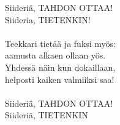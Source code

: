 
Siideriä, TAHDON OTTAA!\\
Siideria, TIETENKIN!\\
\hspace{10mm} \\
Teekkari tietää ja fuksi myös:\\
aamusta alkaen ollaan yös.\\
Yhdessä näin kun dokaillaan,\\
helposti kaiken valmiiksi saa!\\
\hspace{10mm} \\
Siideriä, TAHDON OTTAA!\\
Siideriä, TIETENKIN
\\